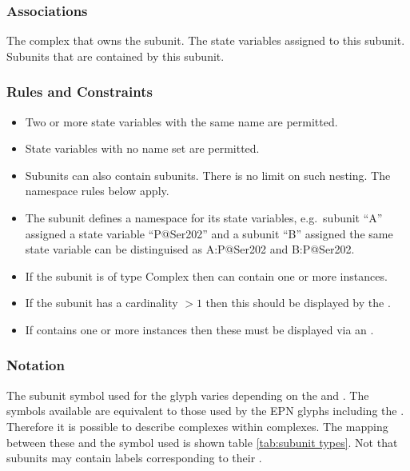 \subsubsection{Associations}

\begin{attributes}
   The complex that owns the subunit.
   The state variables assigned
  to this subunit.
   Subunits that are contained by this subunit.
\end{attributes}

\subsubsection{Rules and Constraints}

\begin{itemize}
\item Two or more state variables with the same name are
  permitted.
\item State variables with no name set are permitted.
\item Subunits can also contain subunits. There is no limit on such nesting. The namespace rules
  below apply.
\item The subunit defines a namespace for its state variables, e.g.\,
  subunit ``A'' assigned a state variable ``P@Ser202''  and a subunit
  ``B'' assigned the same state variable can be distinguised as
  A:P@Ser202 and B:P@Ser202.
\item If the subunit is of type Complex then  can contain one or
  more  instances.
\item If the subunit has a cardinality $>1$ then this should be
  displayed by the .
\item If  contains one or more instances then these
  must be displayed via an .
\end{itemize}

\subsubsection{Notation}

The subunit symbol used for the  glyph varies depending
on the  and . The symbols
available are equivalent to those used by the EPN glyphs including the
. Therefore it is possible to describe complexes within
complexes. The mapping between these and the symbol used is shown
table \ref{tab:subunit types}. Not that subunits may contain labels
corresponding to their .

